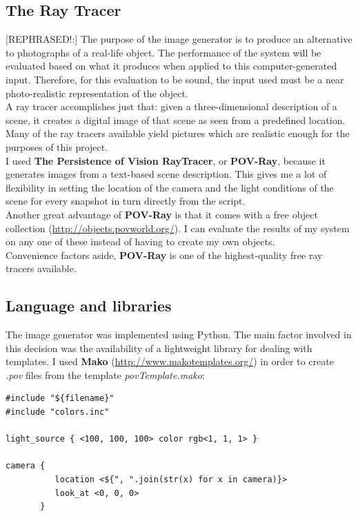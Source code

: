 \documentclass[12pt,a4paper,twoside,openright]{report}
\begin{document}
\subsection{The Ray Tracer} 
[REPHRASED!:] 
The purpose of the image generator is to produce an alternative to photographs of a real-life object. The performance of the system will be evaluated based on what it produces when applied to this computer-generated input. Therefore, for this evaluation to be sound, the input used must be a near photo-realistic representation of the object.\\  
\linebreak
A ray tracer accomplishes just that: given a three-dimensional description of a scene, it creates a digital image of that scene as seen from a predefined location. Many of the ray tracers available yield pictures which are realistic enough for the purposes of this project. \\   
I used \textbf{The Persistence of Vision RayTracer}, or \textbf{POV-Ray}, because it generates images from a text-based scene description. This gives me a lot of flexibility in setting the location of the camera and the light conditions of the scene for every snapshot in turn directly from the script.\\
Another great advantage of \textbf{POV-Ray} is that it comes with a free object collection (\url{http://objects.povworld.org/}). I can evaluate the results of my system on any one of these instead of having to create my own objects.\\
Convenience factors aside, \textbf{POV-Ray} is one of the highest-quality free ray tracers available.

\subsection{Language and libraries}
The image generator was implemented using Python. The main factor involved in this decision was the availability of a lightweight library for dealing with templates. I used \textbf{Mako} (\url{http://www.makotemplates.org/}) in order to create \textit{.pov} files from the template \textit{povTemplate.mako}: 

\begin{verbatim}
#include "${filename}"
#include "colors.inc"

light_source { <100, 100, 100> color rgb<1, 1, 1> }

camera {
          location <${", ".join(str(x) for x in camera)}>
          look_at <0, 0, 0>
       }
\end{verbatim} \\
\end{document}
